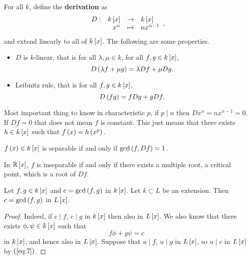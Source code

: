 For all $ k $, define the \textbf{derivation} as
$$ \function[D]{k\sb{x}}{k\sb{x}}{x^n}{nx^{n - 1}}, $$
and extend linearly to all of $ k\sb{x} $. The following are some properties.
\begin{itemize}
\item $ D $ is $ k $-linear, that is for all $ \lambda, \mu \in k $, for all $ f, g \in k\sb{x} $,
$$ D\rb{\lambda f + \mu g} = \lambda Df + \mu Dg. $$
\item Leibnitz rule, that is for all $ f, g \in k\sb{x} $,
$$ D\rb{fg} = fDg + gDf. $$
\end{itemize}
Most important thing to know in characteristic $ p $, if $ p \mid n $ then $ Dx^n = nx^{n - 1} = 0 $. If $ Df = 0 $ that does not mean $ f $ is constant. This just means that there exists $ h \in k\sb{x} $ such that $ f\rb{x} = h\rb{x^p} $.

\begin{proposition}
\label{prop:separable}
$ f\rb{x} \in k\sb{x} $ is separable if and only if $ \gcd\rb{f, Df} = 1 $.
\end{proposition}

In $ \R\sb{x} $, $ f $ is inseparable if and only if there exists a multiple root, a critical point, which is a root of $ Df $.


\begin{lemma}
Let $ f, g \in k\sb{x} $ and $ c = \gcd\rb{f, g} $ in $ k\sb{x} $. Let $ k \subset L $ be an extension. Then $ c = \gcd\rb{f, g} $ in $ L\sb{x} $.
\end{lemma}

\begin{proof}
Indeed, if $ c \mid f $, $ c \mid g $ in $ k\sb{x} $ then also in $ L\sb{x} $. We also know that there exists $ \phi, \psi \in k\sb{x} $ such that
\begin{equation}
\label{eq:7}
f\phi + g\psi = c
\end{equation}
in $ k\sb{x} $, and hence also in $ L\sb{x} $. Suppose that $ u \mid f $, $ u \mid g $ in $ L\sb{x} $, so $ u \mid c $ in $ L\sb{x} $ by $ \rb{\ref{eq:7}} $.
\end{proof}

